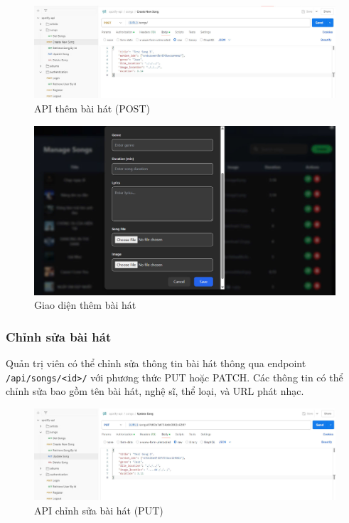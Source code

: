\begin{figure}[H]
    \centering
    \includegraphics[width=1\textwidth]{latex/imgs/api-add-song.jpg}
    \caption{API thêm bài hát (POST)}
\end{figure}

\begin{figure}[H]
    \centering
    \includegraphics[width=1\textwidth]{latex/imgs/frontend-add-song.jpg}
    \caption{Giao diện thêm bài hát}
\end{figure}

\subsubsection{Chỉnh sửa bài hát}
Quản trị viên có thể chỉnh sửa thông tin bài hát thông qua endpoint \texttt{/api/songs/<id>/} với phương thức PUT hoặc PATCH. Các thông tin có thể chỉnh sửa bao gồm tên bài hát, nghệ sĩ, thể loại, và URL phát nhạc.

\begin{figure}[H]
    \centering
    \includegraphics[width=1\textwidth]{latex/imgs/api-edit-song.jpg}
    \caption{API chỉnh sửa bài hát (PUT)}
\end{figure}

